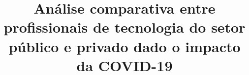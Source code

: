 \title{Análise comparativa entre profissionais de tecnologia do setor público e privado dado o impacto da COVID-19 \\
}